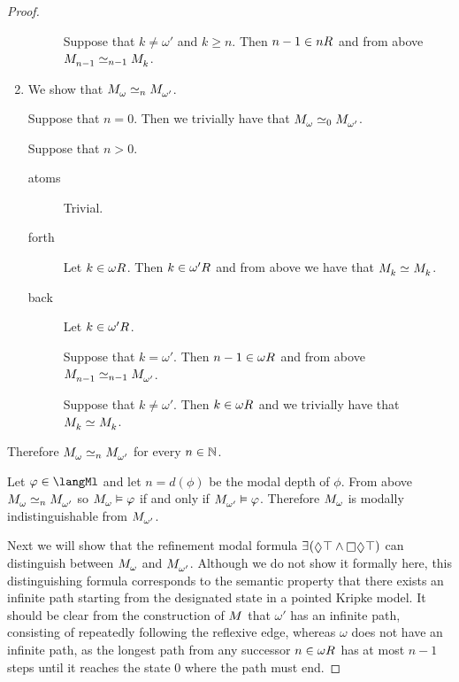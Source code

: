 \begin{proof}
\begin{enumerate}
\begin{description}
                Suppose that $k \neq \omega'$ and $k \geq n$. Then $n - 1 \in \kSuccessors{}{n}$ and from above $\kPModel{n - 1} \bisimilar[n - 1] \kPModel{k}$.
        \end{description}

    \item We show that $\kPModel{\omega} \bisimilar[n] \kPModel{\omega'}$.

        Suppose that $n = 0$. Then we trivially have that $\kPModel{\omega} \bisimilar[0] \kPModel{\omega'}$.

        Suppose that $n > 0$.

        \begin{description}
            \item[atoms] Trivial.

            \item[forth] Let $k \in \kSuccessors{}{\omega}$. Then $k \in \kSuccessors{}{\omega'}$ and from above we have that $\kPModel{k} \bisimilar \kPModel{k}$.

            \item[back] Let $k \in \kSuccessors{}{\omega'}$.

                Suppose that $k = \omega'$. Then $n - 1 \in \kSuccessors{}{\omega}$ and from above $\kPModel{n - 1} \bisimilar[n - 1] \kPModel{\omega'}$.

                Suppose that $k \neq \omega'$. Then $k \in \kSuccessors{}{\omega}$ and we trivially have that $\kPModel{k} \bisimilar \kPModel{k}$.
        \end{description}
\end{enumerate}

Therefore $\kPModel{\omega} \bisimilar[n] \kPModel{\omega'}$ for every $n \in \mathbb{N}$.

Let $\phi \in \langMl$ and let $n = d(\phi)$ be the modal depth of $\phi$.
From above $\kPModel{\omega} \bisimilar[n] \kPModel{\omega'}$ so $\kPModel{\omega} \entails \phi$ if and only if $\kPModel{\omega'} \entails \phi$.
Therefore $\kPModel{\omega}$ is modally indistinguishable from $\kPModel{\omega'}$.

Next we will show that the refinement modal formula $\somerefs (\possible \top \land \necessary \possible \top)$ can distinguish between $\kPModel{\omega}$ and $\kPModel{\omega'}$.
Although we do not show it formally here, this distinguishing formula corresponds to the semantic property that there exists an infinite path starting from the designated state in a pointed Kripke model.
It should be clear from the construction of $\kModel$ that $\omega'$ has an infinite path, consisting of repeatedly following the reflexive edge, whereas $\omega$ does not have an infinite path, as the longest path from any successor $n \in \kSuccessors{}{\omega}$ has at most $n - 1$ steps until it reaches the state $0$ where the path must end.


\end{proof}

